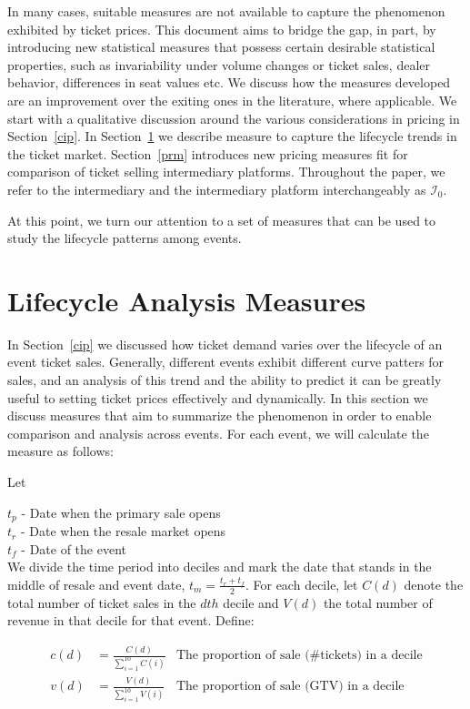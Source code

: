 \documentclass[letterpaper, 12pt]{article}
\begin{document}
In many cases, suitable measures are not available to capture the phenomenon exhibited by ticket prices. This document aims to bridge the gap, in part, by introducing new statistical measures that possess certain desirable statistical properties, such as invariability under volume changes or ticket sales, dealer behavior, differences in seat values etc. We discuss how the measures developed are an improvement over the exiting ones in the literature, where applicable. We start with a qualitative discussion around the various considerations in pricing in Section~\ref{cip}. In Section~\ref{lcm} we describe measure to capture the lifecycle trends in the ticket market. Section~\ref{prm} introduces new pricing measures fit for comparison of ticket selling intermediary platforms. Throughout the paper, we refer to the intermediary and the intermediary platform interchangeably as $\mathcal{I}_0$.

At this point, we turn our attention to a set of measures that can be used to study the lifecycle patterns among events. 
\section{Lifecycle Analysis Measures}\label{lcm}
In Section~\ref{cip} we discussed how ticket demand varies over the lifecycle of an event ticket sales. Generally, different events exhibit different curve patters for sales, and an analysis of this trend and the ability to predict it can be greatly useful to setting ticket prices effectively and dynamically. In this section we discuss measures that aim to summarize the phenomenon in order to enable comparison and analysis across events. For each event, we will calculate the measure as follows:

\noindent Let

\noindent $t_p$ - Date when the primary sale opens\\
$t_r$ - Date when the resale market opens\\
$t_f$ - Date of the event\\ 

We divide the time period into deciles and mark the date that stands in the middle of resale and event date, $t_m = \frac{t_r+t_f}{2}$. For each decile, let $C(d)$ denote the total number of ticket sales in the $dth$ decile and $V(d)$ the total number of revenue in that decile for that event. Define:

\begin{align*}
	c(d) &= \frac{C(d)}{\sum_{i=1}^{10}C(i)}&\text{The proportion of sale (\# tickets) in a decile}\\
	v(d) &= \frac{V(d)}{\sum_{i=1}^{10}V(i)}&\text{The proportion of sale (GTV) in a decile}
\end{align*}
\end{document}
